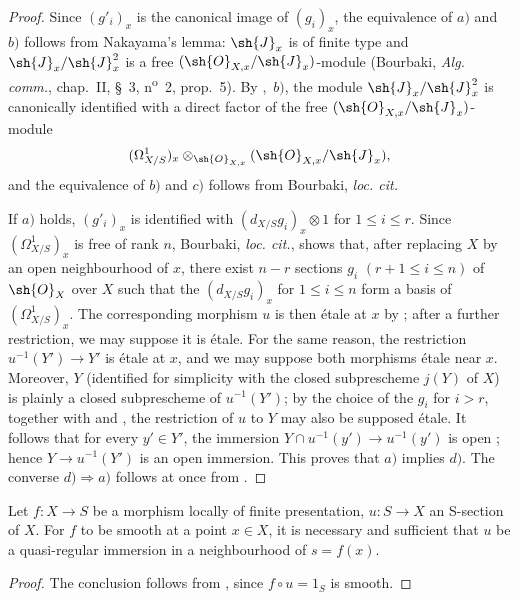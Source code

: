 \begin{proof}
Since $(g'_i)_x$ is the canonical image of $(g_i)_x$, the equivalence of $a)$ and $b)$ follows from Nakayama's lemma: $\sh{J}_x$ is of finite type and $\sh{J}_x/\sh{J}_x^2$ is a free $(\sh{O}_{X,x}/\sh{J}_x)$-module  (Bourbaki, \emph{Alg. comm.}, chap.~II, \S~3, n\textsuperscript{o}~2, prop.~5).
By ,~$b)$, the module $\sh{J}_x/\sh{J}_x^2$ is canonically identified with a direct factor of the free $(\sh{O}_{X,x}/\sh{J}_x)$-module
\[
  (\Omega^1_{X/S})_x\otimes_{\sh{O}_{X,x}}(\sh{O}_{X,x}/\sh{J}_x),
\]
and the equivalence of $b)$ and $c)$ follows from Bourbaki, \emph{loc. cit.}


If $a)$ holds, $(g'_i)_x$ is identified with $(d_{X/S}g_i)_x\otimes1$ for $1\leq i\leq r$.
Since $(\Omega^1_{X/S})_x$ is free of rank $n$, Bourbaki, \emph{loc. cit.}, shows that, after replacing $X$ by an open neighbourhood of $x$, there exist $n-r$ sections $g_i$ $(r+1\leq i\leq n)$ of $\sh{O}_X$ over $X$ such that the $(d_{X/S}g_i)_x$ for $1\leq i\leq n$ form a basis of $(\Omega^1_{X/S})_x$.
The corresponding morphism $u$ is then \'etale at $x$ by ; after a further restriction, we may suppose it is \'etale.
For the same reason, the restriction $u^{-1}(Y')\to Y'$ is \'etale at $x$, and we may suppose both morphisms \'etale near $x$.
Moreover, $Y$ (identified for simplicity with the closed subprescheme $j(Y)$ of $X$) is plainly a closed subprescheme of $u^{-1}(Y')$; by the choice of the $g_i$ for $i>r$, together with  and , the restriction of $u$ to $Y$ may also be supposed \'etale.
It follows that for every $y'\in Y'$, the immersion
$Y\cap u^{-1}(y')\to u^{-1}(y')$ is open ; hence $Y\to u^{-1}(Y')$ is an open immersion.
This proves that $a)$ implies $d)$.
The converse $d)\Rightarrow a)$ follows at once from .
\end{proof}

\begin{corollary}[17.12.3]
\label{IV.17.12.3}
Let $f:X\to S$ be a morphism locally of finite presentation, $u:S\to X$ an S-section of $X$.
For $f$ to be smooth at a point $x\in X$, it is necessary and sufficient that $u$ be a quasi-regular immersion in a neighbourhood of $s=f(x)$.
\end{corollary}

\begin{proof}
The conclusion follows from , since $f\circ u=1_S$ is smooth.
\end{proof}


